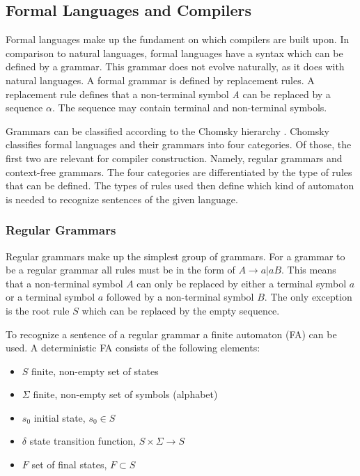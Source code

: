 \subsection{Formal Languages and Compilers}

Formal languages make up the fundament on which compilers are built upon. In comparison to natural languages, formal languages have a syntax which can be defined by a grammar. This grammar does not evolve naturally, as it does with natural languages. A formal grammar is defined by replacement rules. A replacement rule defines that a non-terminal symbol \textit{A} can be replaced by a sequence $\alpha$. The sequence may contain terminal and non-terminal symbols. 

Grammars can be classified according to the Chomsky hierarchy \parencite{CHOMSKY1959137}. Chomsky classifies formal languages and their grammars into four categories. Of those, the first two are relevant for compiler construction. Namely, regular grammars and context-free grammars. The four categories are differentiated by the type of rules that can be defined. The types of rules used then define which kind of automaton is needed to recognize sentences of the given language. 

\subsubsection{Regular Grammars}

Regular grammars make up the simplest group of grammars. For a grammar to be a regular grammar all rules must be in the form of $A\rightarrow a | a B$. This means that a non-terminal symbol $A$ can only be replaced by either a terminal symbol $a$ or a terminal symbol $a$ followed by a non-terminal symbol $B$. The only exception is the root rule $S$ which can be replaced by the empty sequence. 

To recognize a sentence of a regular grammar a finite automaton (FA) can be used. A deterministic FA consists of the following elements:

\begin{itemize}
    \item $S$ finite, non-empty set of states
    \item $\Sigma$ finite, non-empty set of symbols (alphabet)
    \item $s_0$ initial state, $s_0 \in S$
    \item $\delta$ state transition function, $S \times \Sigma \rightarrow S$
    \item $F$ set of final states, $F \subset S$
\end{itemize}

